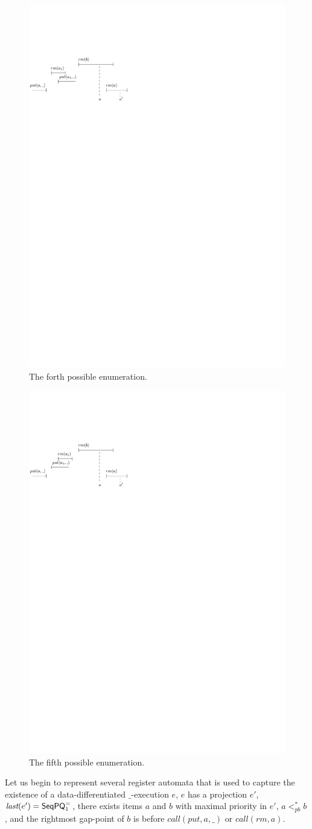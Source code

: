 \begin{figure}[htbp]
  \centering
  \includegraphics[width=0.4 \textwidth]{figures/PIC-HIS-PQ1Equal-4.pdf}
  \caption{The forth possible enumeration.}
  \label{fig:history enumeration 4 for PQ1Equal}
\end{figure}

\begin{figure}[htbp]
  \centering
  \includegraphics[width=0.4 \textwidth]{figures/PIC-HIS-PQ1Equal-5.pdf}
  \caption{The fifth possible enumeration.}
  \label{fig:history enumeration 5 for PQ1Equal}
\end{figure}


Let us begin to represent several register automata that is used to capture the existence of a data-differentiated $\_$-execution $e$, $e$ has a projection $e'$, $\textit{last}(e') = \mathsf{SeqPQ}_1^{=}$, there exists items $a$ and $b$ with maximal priority in $e'$, $a <_{\textit{pb}}^* b$, and the rightmost gap-point of $b$ is before $\textit{call}(\textit{put},a,\_)$ or $\textit{call}(\textit{rm},a)$.

